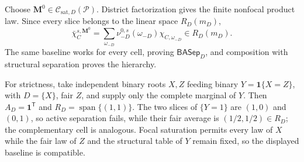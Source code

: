 Choose \(\mathbf M^0\in\mathcal C_{\mathrm{sat},D}(\mathcal P)\).  District factorization gives the finite nonfocal product law.  Since every slice belongs to the linear space \(R_D(m_D)\),
\[
\bar\chi_C^{s,\mathbf M^0}=
\sum_{\omega_{-D}}\nu_{-D}^{0,s}(\omega_{-D})
\chi_{C,\omega_{-D}}\in R_D(m_D).
\]
The same baseline works for every cell, proving \(\mathsf{BASep}_D\), and composition with structural separation proves the hierarchy.

For strictness, take independent binary roots \(X,Z\) feeding binary \(Y=\mathbf1\{X=Z\}\), with \(D=\{X\}\), fair \(Z\), and supply only the complete marginal of \(Y\).  Then \(A_D=\mathbf1^{\mathsf T}\) and \(R_D=\operatorname{span}\{(1,1)\}\).  The two slices of \(\{Y=1\}\) are \((1,0)\) and \((0,1)\), so active separation fails, while their fair average is \((1/2,1/2)\in R_D\); the complementary cell is analogous.  Focal saturation permits every law of \(X\) while the fair law of \(Z\) and the structural table of \(Y\) remain fixed, so the displayed baseline is compatible.